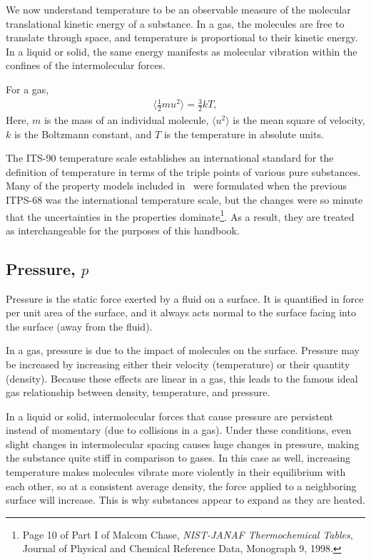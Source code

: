 We now understand temperature to be an observable measure of the molecular translational kinetic energy of a substance.  In a gas, the molecules are free to translate through space, and temperature is proportional to their kinetic energy.  In a liquid or solid, the same energy manifests as molecular vibration within the confines of the intermolecular forces.

For a gas,
\begin{align}
\langle \frac{1}{2} m u^2 \rangle = \frac{3}{2} k T,
\end{align}
Here, $m$ is the mass of an individual molecule, $\langle u^2 \rangle$ is the mean square of velocity, $k$ is the Boltzmann constant, and $T$ is the temperature in absolute units.

The ITS-90 temperature scale establishes an international standard for the definition of temperature in terms of the triple points of various pure substances.  Many of the property models included in \PM\ were formulated when the previous ITPS-68 was the international temperature scale, but the changes were so minute that the uncertainties in the properties dominate\footnote{Page 10 of Part I of Malcom Chase, \emph{NIST-JANAF Thermochemical Tables}, Journal of Physical and Chemical Reference Data, Monograph 9, 1998.}.  As a result, they are treated as interchangeable for the purposes of this handbook.

\subsection{Pressure, $p$}\label{sec:intro:p}

Pressure is the static force exerted by a fluid on a surface.  It is quantified in force per unit area of the surface, and it always acts normal to the surface facing into the surface (away from the fluid).  

In a gas, pressure is due to the impact of molecules on the surface.  Pressure may be increased by increasing either their velocity (temperature) or their quantity (density).  Because these effects are linear in a gas, this leads to the famous ideal gas relationship between density, temperature, and pressure.  

In a liquid or solid, intermolecular forces that cause pressure are persistent instead of momentary (due to collisions in a gas).  Under these conditions, even slight changes in intermolecular spacing causes huge changes in pressure, making the substance quite stiff in comparison to gases.  In this case as well, increasing temperature makes molecules vibrate more violently in their equilibrium with each other, so at a consistent average density, the force applied to a neighboring surface will increase.  This is why substances appear to expand as they are heated.

